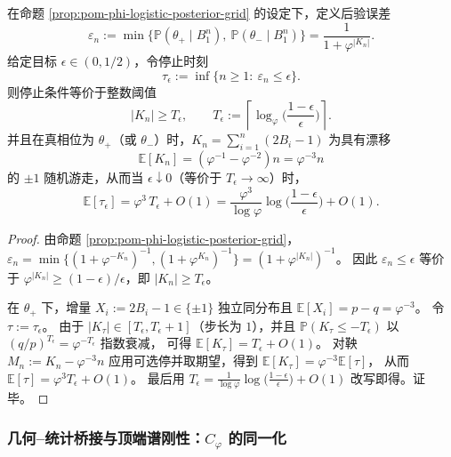 \begin{proposition}\label{prop:pom-confidence-hitting-time-phi-threshold}
在命题 \ref{prop:pom-phi-logistic-posterior-grid} 的设定下，定义后验误差
\[
\varepsilon_n:=\min\{\mathbb{P}(\theta_+\mid B_1^n),\ \mathbb{P}(\theta_-\mid B_1^n)\}
=\frac{1}{1+\varphi^{|K_n|}}.
\]
给定目标 \(\epsilon\in(0,1/2)\)，令停止时刻
\[
\tau_\epsilon:=\inf\{n\ge 1:\ \varepsilon_n\le \epsilon\}.
\]
则停止条件等价于整数阈值
\[
\boxed{\;
|K_n|\ge T_\epsilon,\qquad
T_\epsilon:=\left\lceil\log_\varphi\!\Big(\frac{1-\epsilon}{\epsilon}\Big)\right\rceil.\;}
\]
并且在真相位为 \(\theta_+\)（或 \(\theta_-\)）时，\(K_n=\sum_{i=1}^n(2B_i-1)\) 为具有漂移
\[
\mathbb{E}[K_n]=(\varphi^{-1}-\varphi^{-2})n=\varphi^{-3}n
\]
的 \(\pm 1\) 随机游走，从而当 \(\epsilon\downarrow 0\)（等价于 \(T_\epsilon\to\infty\)）时，
\[
\boxed{\;
\mathbb{E}[\tau_\epsilon]=\varphi^{3}\,T_\epsilon+O(1)
=\frac{\varphi^{3}}{\log\varphi}\log\!\Big(\frac{1-\epsilon}{\epsilon}\Big)+O(1).\;}
\]
\end{proposition}

\begin{proof}
由命题 \ref{prop:pom-phi-logistic-posterior-grid}，\(\varepsilon_n=\min\{(1+\varphi^{-K_n})^{-1},(1+\varphi^{K_n})^{-1}\}=(1+\varphi^{|K_n|})^{-1}\)。
因此 \(\varepsilon_n\le \epsilon\) 等价于 \(\varphi^{|K_n|}\ge (1-\epsilon)/\epsilon\)，即 \(|K_n|\ge T_\epsilon\)。
\par
在 \(\theta_+\) 下，增量 \(X_i:=2B_i-1\in\{\pm 1\}\) 独立同分布且
\(
\mathbb{E}[X_i]=p-q=\varphi^{-3}
\)。
令 \(\tau:=\tau_\epsilon\)。
由于 \(|K_\tau|\in[T_\epsilon,T_\epsilon+1]\)（步长为 \(1\)），并且 \(\mathbb{P}(K_\tau\le -T_\epsilon)\) 以 \((q/p)^{T_\epsilon}=\varphi^{-T_\epsilon}\) 指数衰减，
可得 \(\mathbb{E}[K_\tau]=T_\epsilon+O(1)\)。
对鞅 \(M_n:=K_n-\varphi^{-3}n\) 应用可选停并取期望，得到
\(
\mathbb{E}[K_\tau]=\varphi^{-3}\mathbb{E}[\tau]
\)，
从而 \(\mathbb{E}[\tau]=\varphi^{3}T_\epsilon+O(1)\)。
最后用
\(
T_\epsilon=\frac{1}{\log\varphi}\log\bigl(\frac{1-\epsilon}{\epsilon}\bigr)+O(1)
\)
改写即得。证毕。
\end{proof}

\subsubsection{几何--统计桥接与顶端谱刚性：\texorpdfstring{$C_\varphi$}{Cphi} 的同一化}

